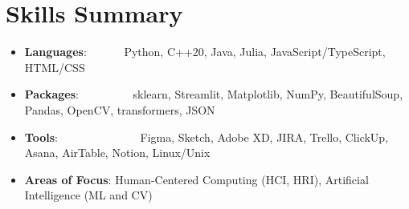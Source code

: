 \documentclass[a4paper,11pt]{extarticle}
\newcommand{\resumeSkillItem}[2]{
	\item\small{
		\textbf{#1}{: #2 \vspace{-2pt}}
	}
}
\newcommand{\resumeSubItem}[2]{\resumeSkillItem{#1}{#2}\vspace{-5pt}}
\newcommand{\resumeSubHeadingListStart}{
    \begin{itemize}[leftmargin=0.15in,label={}]}
\newcommand{\resumeSubHeadingListEnd}{\end{itemize}}
\begin{document}
\section{Skills Summary}
	\resumeSubHeadingListStart
		\resumeSubItem{Languages}
            {\hspace{0.2mm}~~~~~~Python, C++20, Java, Julia, JavaScript/TypeScript, HTML/CSS}
		\resumeSubItem{Packages}
            {\hspace{0.2mm}~~~~~~~~~sklearn, Streamlit, Matplotlib, NumPy, BeautifulSoup, Pandas, OpenCV, transformers, JSON}
            \resumeSubItem{Tools}
            {\hspace{0.2mm}~~~~~~~~~~~~~~Figma, Sketch, Adobe XD, JIRA, Trello, ClickUp, Asana, AirTable, Notion, Linux/Unix}
            \resumeSubItem{Areas of Focus}
            {\hspace{0.2mm}Human-Centered Computing (HCI, HRI), Artificial Intelligence (ML and CV)}          
	\resumeSubHeadingListEnd
\end{document}
